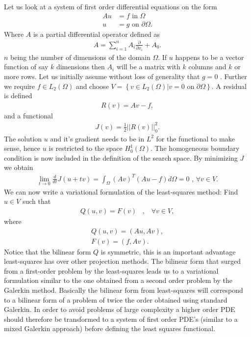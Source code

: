 Let us look at a system of first order differential equations on the form 
\begin{align}
	Au &= f \text{ in } \Omega \\
	u &= g \text{ on } \partial \Omega.
	\label{eq:PDE}
\end{align}
Where $A$ is a partial differential operator defined as 
\begin{align}
	A = \sum_{i = 1}^{n} A_i\frac{\partial}{\partial x_i} + A_0.
	\label{def:operatorA}
\end{align}
	$n$ being the number of dimensions of the domain $\Omega$. If $u$ happens to be a vector function of say $k$ dimensions then $A_i$ will be a matrix with $k$ columns and $k$ or more rows. Let us initially assume without loss of generality that $g=0$ . Further we require $f \in L_2(\Omega)$ and choose $V = \left\{ v\in L_2(\Omega) | v = 0 \text{ on } \partial \Omega \right\}$. A residual is defined
\begin{align}
	R(v) = Av-f,
	\label{eq:Residual}
\end{align}
and a functional
\begin{align}
	 J(v) = \frac{1}{2}||R(v)||^2_0.
	\label{eq:Functional}
\end{align} 
The solution $u$ and it's gradient needs to be in $L^2$ for the functional to make sense, hence $u$ is restricted to the space $H^1_0(\Omega)$. The homogeneous boundary condition is now included in the definition of the search space. By minimizing $J$ we obtain 
\begin{align}
	\lim_{t\rightarrow 0} \frac{d}{dt}J(u+tv) = \int_{\Omega}(Av)^T(Au-f)d\Omega = 0 \text{    ,   } \forall v \in V.
	\label{eq:minProb}
\end{align}
We can now write a variational formulation of the least-squares method: Find $u \in V$ such that 
\begin{align}
	Q(u,v) = F(v) \; \; \; , \; \; \; \forall v \in V,
	\label{def:varForm}
\end{align}
where
\begin{align}
	Q(u,v) = (Au,Av), \\
	F(v) = (f,Av).
	\label{def:bilin}
\end{align}
Notice that the bilinear form $Q$ is symmetric, this is an important advantage least-squares has over other projection methods. The bilinear form that surged from a first-order problem by the least-squares leads us to a variational formulation similar to the one obtained from a second order problem by the Galerkin method. Basically the bilinear form from least-squares will correspond to a bilinear form of a problem of twice the order obtained using standard Galerkin. In order to avoid problems of large complexity a higher order PDE should therefore be transformed to a system of first order PDE's (similar to a mixed Galerkin approach) before defining the least squares functional.
